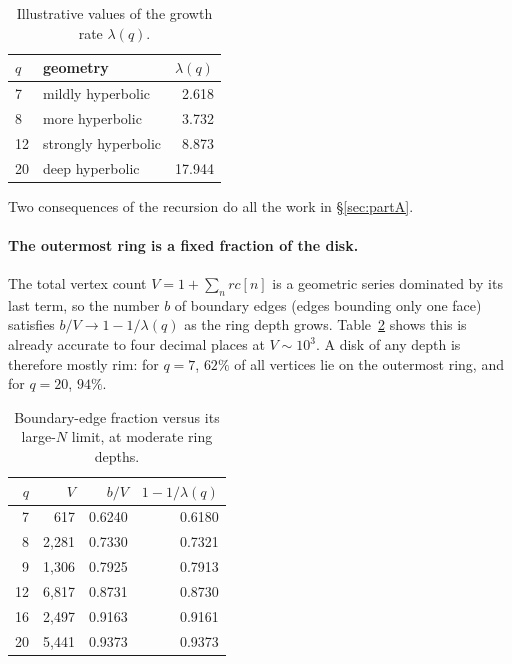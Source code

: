 \documentclass[11pt]{article}
\begin{document}
\begin{table}[htbp]
\centering
\begin{tabular}{llr}
\toprule
$q$ & geometry & $\lambda(q)$ \\
\midrule
7  & mildly hyperbolic & 2.618 \\
8  & more hyperbolic & 3.732 \\
12 & strongly hyperbolic & 8.873 \\
20 & deep hyperbolic & 17.944 \\
\bottomrule
\end{tabular}
\caption{Illustrative values of the growth rate $\lambda(q)$.}
\label{tab:ladder}
\end{table}

Two consequences of the recursion do all the work in \S\ref{sec:partA}.

\paragraph{The outermost ring is a fixed fraction of the disk.} The total vertex count $V=1+\sum_n rc[n]$ is a geometric series dominated by its last term, so the number $b$ of boundary edges (edges bounding only one face) satisfies $b/V\to1-1/\lambda(q)$ as the ring depth grows. Table~\ref{tab:boundary} shows this is already accurate to four decimal places at $V\sim10^3$. A disk of any depth is therefore mostly rim: for $q=7$, $62\%$ of all vertices lie on the outermost ring, and for $q=20$, $94\%$.

\begin{table}[htbp]
\centering
\begin{tabular}{rrrr}
\toprule
$q$ & $V$ & $b/V$ & $1-1/\lambda(q)$ \\
\midrule
7  & 617     & 0.6240 & 0.6180 \\
8  & 2{,}281 & 0.7330 & 0.7321 \\
9  & 1{,}306 & 0.7925 & 0.7913 \\
12 & 6{,}817 & 0.8731 & 0.8730 \\
16 & 2{,}497 & 0.9163 & 0.9161 \\
20 & 5{,}441 & 0.9373 & 0.9373 \\
\bottomrule
\end{tabular}
\caption{Boundary-edge fraction versus its large-$N$ limit, at moderate ring depths.}
\label{tab:boundary}
\end{table}
\end{document}
